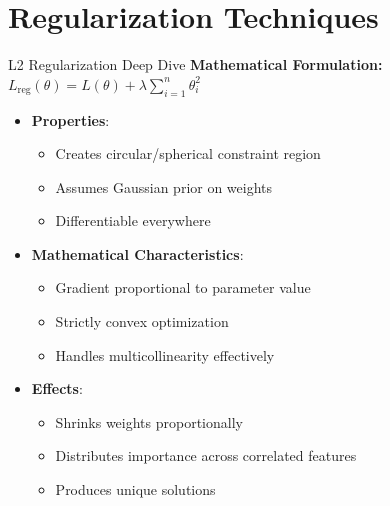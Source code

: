 \documentclass{beamer}
\begin{document}
\section{Regularization Techniques}

\begin{frame}{L2 Regularization Deep Dive}
\textbf{Mathematical Formulation:}
$L_{\text{reg}}(\theta) = L(\theta) + \lambda \sum_{i=1}^{n} \theta_i^2 $
\begin{itemize}
    \item \textbf{Properties}:
    \begin{itemize}
        \item Creates circular/spherical constraint region
        \item Assumes Gaussian prior on weights
        \item Differentiable everywhere
    \end{itemize}
    \item \textbf{Mathematical Characteristics}:
    \begin{itemize}
        \item Gradient proportional to parameter value
        \item Strictly convex optimization
        \item Handles multicollinearity effectively
    \end{itemize}
    \item \textbf{Effects}:
    \begin{itemize}
        \item Shrinks weights proportionally
        \item Distributes importance across correlated features
        \item Produces unique solutions
    \end{itemize}
\end{itemize}
\end{frame}
\end{document}
